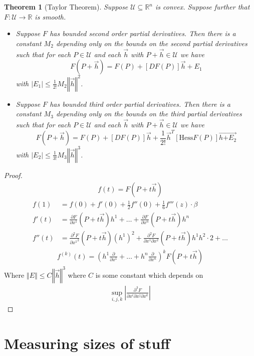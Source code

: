 \documentclass[12pt]{armath}
\newtheorem{theorem}{Theorem}[section]
\newcommand{\U}{\mathcal{U}}
\newcommand{\ra}{\rightarrow}
\newcommand{\R}{\mathbb{R}}
\newcommand{\abs}[1]{\left\vert{#1}\right\vert}
\newcommand{\aabs}[1]{\left\Vert{#1}\right\Vert}
\newcommand{\pder}[2]{\frac{\partial #1}{\partial #2}}
\newcommand{\ppder}[2]{\frac{\partial^2 #1}{{\partial #2}^2}}
\begin{document}
\begin{theorem}[Taylor Theorem]
  Suppose $\U\subseteq\R^n$ is convex. Suppose further that $F:\U\ra\R$ is
  smooth.
  \begin{itemize}
    \item Suppose $F$ has bounded second order partial derivatives. Then there
      is a constant $M_2$ depending only on the bounds on the second partial
      derivatives such that for each $P\in \U$ and each $\vec{h}$ with
      $P+\vec{h}\in\U$ we have
      \[
        F(P+\vec{h})=F(P)+[DF(P)]\vec{h}+E_1
      \]
      with $\abs{E_1}\leq\frac{1}{2!}M_2\aabs{\vec{h}}^2$.
    \item Suppose $F$ has bounded third order partial derivatives. Then there
      is a constant $M_3$ depending only on the bounds on the third partial
      derivatives such that for each $P\in\U$ and each $\vec{h}$ with
      $P+\vec{h}\in\U$ we have
      \[
        F(P+\vec{h})=F(P)+[DF(P)]\vec{h}+\frac{1}{2!}\vec{h}^T[\text{Hess}F(P)]\vec{h{+E_2}}
      \]
      with $\abs{E_2}\leq\frac{1}{3!}M_3\aabs{\vec{h}}^3$.
  \end{itemize}
\end{theorem}

\begin{proof}
  \begin{align*}
    f(t)=F(P+t\vec{h})
  \end{align*}
  \begin{align*}
    f(1)&=f(0)+f'(0)+\frac{1}{2}f''(0)+\frac{1}{6}f'''(z)\cdot \beta\\
    f'(t)&=\pder{F}{x^1}(P+t\vec{h})h^1+\ldots+\pder{F}{x^n}(P+t\vec{h})h^n\\
    f''(t)&=\ppder{F}{x^1}(P+t\vec{h})(h^1)^2+\frac{\partial^2 F}{\partial
    x^1\partial x^2}(P+t\vec{h})h^1h^2\cdot 2+\ldots
    \end{align*}
    \begin{align*}
      f^{(k)}(t)=\left(h^1\pder{}{x^1}+\ldots+h^n\pder{}{x^n}\right)^kF(P+t\vec{h})
    \end{align*}
    Where $\aabs{E}\leq C\aabs{\vec{h}}^3$ where $C$ is some constant which
    depends on
    \begin{align*}
      \sup_{i,j,k}\abs{\frac{\partial^3 F}{\partial x^i\partial x^j\partial x^k}}
    \end{align*}
  \end{proof}

  \section{Measuring sizes of stuff}%
  \label{sec:measuring_sizes_of_stuff}
\end{document}
